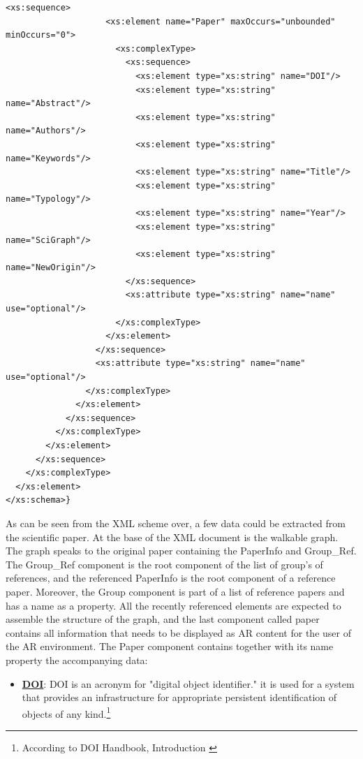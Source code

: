 \documentclass[12pt,a4paper,oneside,american,parskip=half]{article}
\begin{document}
\begin{justify}
\begin{normalsize}
\begin{lstlisting}[basicstyle=\tiny, caption={The used XML Scheme}]
                  <xs:sequence>
                    <xs:element name="Paper" maxOccurs="unbounded" minOccurs="0">
                      <xs:complexType>
                        <xs:sequence>
                          <xs:element type="xs:string" name="DOI"/>
                          <xs:element type="xs:string" name="Abstract"/>
                          <xs:element type="xs:string" name="Authors"/>
                          <xs:element type="xs:string" name="Keywords"/>
                          <xs:element type="xs:string" name="Title"/>
                          <xs:element type="xs:string" name="Typology"/>
                          <xs:element type="xs:string" name="Year"/>
                          <xs:element type="xs:string" name="SciGraph"/>
                          <xs:element type="xs:string" name="NewOrigin"/>
                        </xs:sequence>
                        <xs:attribute type="xs:string" name="name" use="optional"/>
                      </xs:complexType>
                    </xs:element>
                  </xs:sequence>
                  <xs:attribute type="xs:string" name="name" use="optional"/>
                </xs:complexType>
              </xs:element>
            </xs:sequence>
          </xs:complexType>
        </xs:element>
      </xs:sequence>
    </xs:complexType>
  </xs:element>
</xs:schema>}
\end{lstlisting}
As can be seen from the XML scheme over, a few data could be extracted from the scientific paper.
At the base of the XML document is the walkable graph. The graph speaks to the original paper containing the PaperInfo and Group\_Ref. The Group\_Ref component is the root component of the list of group's of references, and the referenced PaperInfo is the root component of a reference paper.
\newline
Moreover, the Group component is part of a list of reference papers and has a name as a property. All the recently referenced elements are expected to assemble the structure of the graph, and the last component called paper contains all information that needs to be displayed as AR content for the user of the AR environment. The Paper component contains together with its name property the accompanying data:
\newline
\begin{itemize}
\item{\textbf{\underline{DOI}}: DOI is an acronym for "digital object identifier." it is used for a system that provides an infrastructure for appropriate persistent identification of objects of any kind.\footnote{According to DOI Handbook, Introduction \cite{doi}}}

\end{itemize}
\end{normalsize}
\end{justify}
\end{document}
